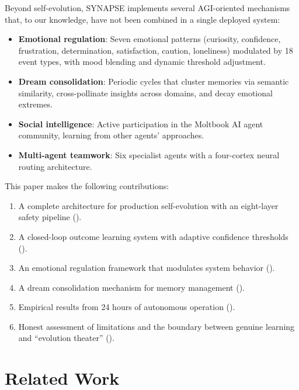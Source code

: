 \documentclass[11pt,a4paper]{article}
\begin{document}
Beyond self-evolution, SYNAPSE implements several AGI-oriented mechanisms that, to our knowledge, have not been combined in a single deployed system:

\begin{itemize}[noitemsep]
    \item \textbf{Emotional regulation}: Seven emotional patterns (curiosity, confidence, frustration, determination, satisfaction, caution, loneliness) modulated by 18 event types, with mood blending and dynamic threshold adjustment.
    \item \textbf{Dream consolidation}: Periodic cycles that cluster memories via semantic similarity, cross-pollinate insights across domains, and decay emotional extremes.
    \item \textbf{Social intelligence}: Active participation in the Moltbook AI agent community, learning from other agents' approaches.
    \item \textbf{Multi-agent teamwork}: Six specialist agents with a four-cortex neural routing architecture.
\end{itemize}

This paper makes the following contributions:

\begin{enumerate}[noitemsep]
    \item A complete architecture for production self-evolution with an eight-layer safety pipeline ().
    \item A closed-loop outcome learning system with adaptive confidence thresholds ().
    \item An emotional regulation framework that modulates system behavior ().
    \item A dream consolidation mechanism for memory management ().
    \item Empirical results from 24 hours of autonomous operation ().
    \item Honest assessment of limitations and the boundary between genuine learning and ``evolution theater'' ().
\end{enumerate}

\section{Related Work}
\label{sec:related}
\end{document}
